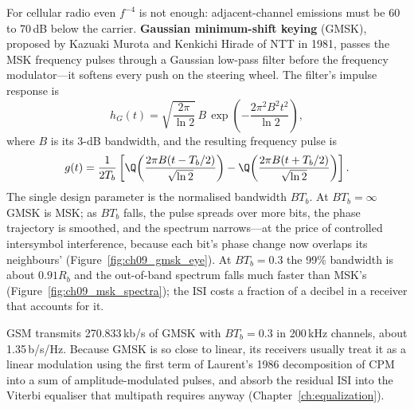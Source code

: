 For cellular radio even $f^{-4}$ is not enough: adjacent-channel emissions must be 60 to 70\,dB
below the carrier. \textbf{Gaussian minimum-shift keying}
(GMSK), proposed by Kazuaki Murota and Kenkichi Hirade of NTT in 1981, passes the MSK frequency
pulses through a Gaussian low-pass filter before the frequency modulator---it softens every push
on the steering wheel. The filter's impulse response is
\begin{equation}
h_G(t)=\sqrt{\frac{2\pi}{\ln2}}\,B\,\exp\!\left(-\frac{2\pi^2B^2t^2}{\ln2}\right),
\end{equation}
where $B$ is its 3-dB bandwidth, and the resulting frequency pulse is
\begin{equation}
g(t)=\frac{1}{2T_b}\left[\Q\!\left(\frac{2\pi B(t-T_b/2)}{\sqrt{\ln2}}\right)-
\Q\!\left(\frac{2\pi B(t+T_b/2)}{\sqrt{\ln2}}\right)\right].
\label{eq:ch09:gmsk}
\end{equation}
The single design parameter is the normalised bandwidth $BT_b$. At $BT_b=\infty$ GMSK is MSK; as
$BT_b$ falls, the pulse spreads over more bits, the phase trajectory is smoothed, and the spectrum
narrows---at the price of controlled intersymbol interference, because each bit's phase change now
overlaps its neighbours' (Figure~\ref{fig:ch09_gmsk_eye}). At $BT_b=0.3$ the 99\% bandwidth is
about $0.91R_b$ and the out-of-band spectrum falls much faster than MSK's
(Figure~\ref{fig:ch09_msk_spectra}); the ISI costs a fraction of a decibel in a receiver that
accounts for it.


GSM transmits 270.833\,kb/s of GMSK with $BT_b=0.3$ in 200\,kHz channels, about 1.35\,b/s/Hz.
Because GMSK is so close to linear, its receivers usually treat it as a linear modulation using the
first term of Laurent's 1986 decomposition of CPM into a sum of amplitude-modulated pulses, and
absorb the residual ISI into the Viterbi equaliser that multipath requires anyway
(Chapter~\ref{ch:equalization}).


